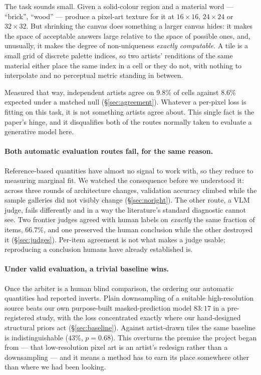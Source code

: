 \documentclass{article}
\begin{document}
The task sounds small. Given a solid-colour region and a material word ---
``brick'', ``wood'' --- produce a pixel-art texture for it at $16\times16$,
$24\times24$ or $32\times32$. But shrinking the canvas does something a
larger canvas hides: it makes the space of acceptable answers large relative
to the space of possible ones, and, unusually, it makes the degree of
non-uniqueness \emph{exactly computable}. A tile is a small grid of discrete
palette indices, so two artists' renditions of the same material either place
the same index in a cell or they do not, with nothing to interpolate and no
perceptual metric standing in between.

Measured that way, independent artists agree on $9.8\%$ of cells against
$8.6\%$ expected under a matched null (\S\ref{sec:agreement}). Whatever a
per-pixel loss is fitting on this task, it is not something artists agree
about. This single fact is the paper's hinge, and it disqualifies both of the
routes normally taken to evaluate a generative model here.

\paragraph{Both automatic evaluation routes fail, for the same reason.}
Reference-based quantities have almost no signal to work with, so they reduce
to measuring marginal fit. We watched the consequence before we understood
it: across three rounds of architecture changes, validation accuracy climbed
while the sample galleries did not visibly change (\S\ref{sec:noright}). The
other route, a VLM judge, fails differently and in a way the literature's
standard diagnostic cannot see. Two frontier judges agreed with human labels
on \emph{exactly} the same fraction of items, $66.7\%$, and one preserved the
human conclusion while the other destroyed it (\S\ref{sec:judges}). Per-item
agreement is not what makes a judge usable; reproducing a conclusion humans
have already established is.

\paragraph{Under valid evaluation, a trivial baseline wins.} Once the arbiter
is a human blind comparison, the ordering our automatic quantities had
reported inverts. Plain downsampling of a suitable high-resolution source
beats our own purpose-built masked-prediction model $83{:}17$ in a
pre-registered study, with the loss concentrated exactly where our
hand-designed structural priors act (\S\ref{sec:baseline}). Against
artist-drawn tiles the same baseline is indistinguishable ($43\%$,
$p{=}0.68$). This overturns the premise the project began from --- that
low-resolution pixel art is an artist's redesign rather than a downsampling
--- and it means a method has to earn its place somewhere other than where we
had been looking.
\end{document}
